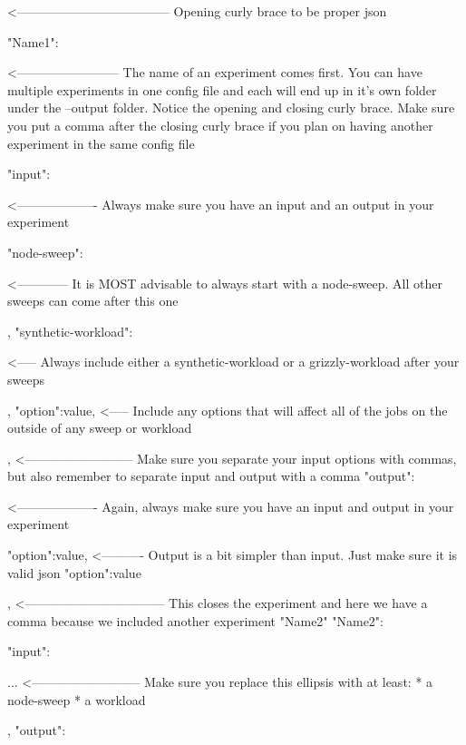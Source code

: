\documentclass[titlepage]{article}
\newenvironment{regular}{\color{black}}{}
\begin{document}
\begin{regular}
\begin{terminal}
    {       <------------------------------------   Opening curly brace to be proper json
    
        "Name1":{       <------------------------   The name of an experiment comes first.  You can have multiple experiments
                                                    in one config file and each will end up in it's own folder under the --output folder.
                                                    Notice the opening and closing curly brace.  Make sure you put a comma after the closing
                                                    curly brace if you plan on having another experiment in the same config file
                
                "input":{    <-------------------   Always make sure you have an input and an output in your experiment
                
                    "node-sweep":{  <------------   It is MOST advisable to always start with a node-sweep.  All other sweeps can come after this one
                    
                    },
                    "synthetic-workload":{ <-----   Always include either a synthetic-workload or a grizzly-workload after your sweeps
                    
                    },
                    "option":value,        <-----   Include any options that will affect all of the jobs on the outside of any sweep or workload
                
                },    <--------------------------   Make sure you separate your input options with commas, but also remember to separate input
                                                    and output with a comma
                "output":{   <-------------------   Again, always make sure you have an input and output in your experiment
                
                    "option":value,   <----------   Output is a bit simpler than input.  Just make sure it is valid json
                    "option":value
                
                }
        
        
        },     <---------------------------------   This closes the experiment and here we have a comma because we included another experiment "Name2"
        "Name2":{
            "input":{
            
                ...  <--------------------------    Make sure you replace this ellipsis with at least:
                                                        * a node-sweep
                                                        * a workload
            },
            "output":{
            
}}}
\end{terminal}
\end{regular}
\end{document}
